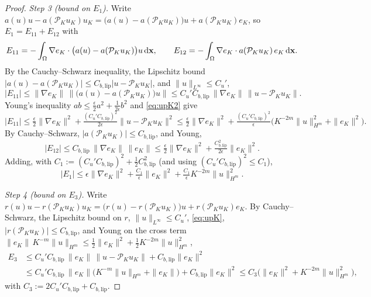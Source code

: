\documentclass[a4paper,fleqn]{cas-sc}
\theoremstyle{definition}
\theoremstyle{remark}
\begin{document}
\begin{proof}
\emph{Step 3 (bound on $E_1$).} Write
$a(u)u-a(\mathcal P_Ku_K)u_K=\bigl(a(u)-a(\mathcal P_Ku_K)\bigr)u+a(\mathcal P_Ku_K)e_K$,
so $E_1=E_{11}+E_{12}$ with
\[
E_{11}=-\int_\Omega\nabla e_K\cdot\bigl(a(u)-a(\mathcal P_Ku_K)\bigr)u\,\mathrm{d}\mathbf{x},\qquad
E_{12}=-\int_\Omega\nabla e_K\cdot a(\mathcal P_Ku_K)\,e_K\,\mathrm{d}\mathbf{x}.
\]
By the Cauchy--Schwarz inequality, the Lipschitz bound
$|a(u)-a(\mathcal P_Ku_K)|\le C_{b,\mathrm{lip}}|u-\mathcal P_Ku_K|$, and
$\|u\|_{L^\infty}\le C_u'$,
\[
|E_{11}|\le\|\nabla e_K\|\,\bigl\|\bigl(a(u)-a(\mathcal P_Ku_K)\bigr)u\bigr\|
\le C_u'C_{b,\mathrm{lip}}\,\|\nabla e_K\|\,\|u-\mathcal P_Ku_K\|.
\]
Young's inequality $ab\le\tfrac{\epsilon}{2}a^2+\tfrac1{2\epsilon}b^2$ and
\eqref{eq:upK2} give
\[
|E_{11}|\le\tfrac{\epsilon}{2}\|\nabla e_K\|^2
+\tfrac{(C_u'C_{b,\mathrm{lip}})^2}{2\epsilon}\|u-\mathcal P_Ku_K\|^2
\le\tfrac{\epsilon}{2}\|\nabla e_K\|^2
+\tfrac{(C_u'C_{b,\mathrm{lip}})^2}{\epsilon}\bigl(K^{-2m}\|u\|_{H^m}^2+\|e_K\|^2\bigr).
\]
By Cauchy--Schwarz, $|a(\mathcal P_Ku_K)|\le C_{b,\mathrm{lip}}$, and Young,
\[
|E_{12}|\le C_{b,\mathrm{lip}}\,\|\nabla e_K\|\,\|e_K\|
\le\tfrac{\epsilon}{2}\|\nabla e_K\|^2+\tfrac{C_{b,\mathrm{lip}}^2}{2\epsilon}\|e_K\|^2.
\]
Adding, with $C_1:=(C_u'C_{b,\mathrm{lip}})^2+\tfrac12 C_{b,\mathrm{lip}}^2$ (and using
$(C_u'C_{b,\mathrm{lip}})^2\le C_1$),
\begin{equation}\label{eq:E1}
|E_1|\le\epsilon\|\nabla e_K\|^2+\tfrac{C_1}{\epsilon}\|e_K\|^2
+\tfrac{C_1}{\epsilon}K^{-2m}\|u\|_{H^m}^2.
\end{equation}

\emph{Step 4 (bound on $E_3$).} Write
$r(u)u-r(\mathcal P_Ku_K)u_K=\bigl(r(u)-r(\mathcal P_Ku_K)\bigr)u+r(\mathcal P_Ku_K)e_K$.
By Cauchy--Schwarz, the Lipschitz bound on $r$, $\|u\|_{L^\infty}\le C_u'$,
\eqref{eq:upK}, $|r(\mathcal P_Ku_K)|\le C_{b,\mathrm{lip}}$, and Young on the cross
term $\|e_K\|\,K^{-m}\|u\|_{H^m}\le\tfrac12\|e_K\|^2+\tfrac12K^{-2m}\|u\|_{H^m}^2$,
\[
\begin{aligned}
E_3&\le C_u'C_{b,\mathrm{lip}}\,\|e_K\|\,\|u-\mathcal P_Ku_K\|+C_{b,\mathrm{lip}}\|e_K\|^2\\
&\le C_u'C_{b,\mathrm{lip}}\,\|e_K\|\bigl(K^{-m}\|u\|_{H^m}+\|e_K\|\bigr)+C_{b,\mathrm{lip}}\|e_K\|^2
\le C_3\bigl(\|e_K\|^2+K^{-2m}\|u\|_{H^m}^2\bigr),
\end{aligned}
\]
with $C_3:=2C_u'C_{b,\mathrm{lip}}+C_{b,\mathrm{lip}}$.


\end{proof}
\end{document}

